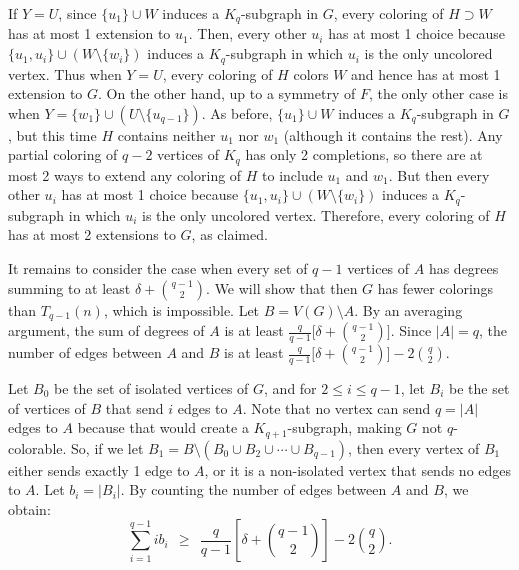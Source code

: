 \documentclass[11pt]{article}
\begin{document}
If $Y = U$, since $\{u_1\} \cup W$ induces a $K_q$-subgraph in $G$,
every coloring of $H \supset W$ has at most 1 extension to $u_1$.
Then, every other $u_i$ has at most 1 choice because $\{u_1, u_i\}
\cup (W \setminus \{w_i\})$ induces a $K_q$-subgraph in which $u_i$ is
the only uncolored vertex.  Thus when $Y = U$, every coloring of $H$
colors $W$ and hence has at most 1 extension to $G$.  On the other
hand, up to a symmetry of $F$, the only other case is when $Y =
\{w_1\} \cup (U \setminus \{u_{q-1}\})$.  As before, $\{u_1\} \cup W$
induces a $K_q$-subgraph in $G$, but this time $H$ contains neither
$u_1$ nor $w_1$ (although it contains the rest).  Any partial coloring
of $q-2$ vertices of $K_q$ has only 2 completions, so there are at
most 2 ways to extend any coloring of $H$ to include $u_1$ and $w_1$.
But then every other $u_i$ has at most 1 choice because $\{u_1, u_i\}
\cup (W \setminus \{w_i\})$ induces a $K_q$-subgraph in which $u_i$ is
the only uncolored vertex.  Therefore, every coloring of $H$ has at
most 2 extensions to $G$, as claimed.




It remains to consider the case when every set of $q-1$ vertices of
$A$ has degrees summing to at least $\delta + {q-1 \choose 2}$.  We
will show that then $G$ has fewer colorings than $T_{q-1}(n)$, which
is impossible.  Let $B = V(G) \setminus A$.  By an averaging argument,
the sum of degrees of $A$ is at least $\frac{q}{q-1} \big[ \delta +
{q-1 \choose 2} \big]$. Since $|A|=q$, the number of edges between $A$ and $B$ is
at least $\frac{q}{q-1} \big[ \delta + {q-1 \choose 2} \big] - 2 {q
  \choose 2}$.

Let $B_0$ be the set of isolated vertices of $G$, and for $2 \leq i
\leq q-1$, let $B_i$ be the set of vertices of $B$ that send $i$ edges
to $A$.  Note that no vertex can send $q = |A|$ edges to $A$ because
that would create a $K_{q+1}$-subgraph, making $G$ not $q$-colorable.
So, if we let $B_1 = B \setminus (B_0 \cup B_2 \cup \cdots \cup
B_{q-1})$, then every vertex of $B_1$ either sends exactly 1 edge to
$A$, or it is a non-isolated vertex that sends no edges to $A$.  Let
$b_i = |B_i|$.  By counting the number of edges between $A$ and $B$,
we obtain:
\begin{equation}
  \label{ineq:sum-ibi}
  \sum_{i=1}^{q-1} i b_i 
  \ \ \geq \ \ 
  \frac{q}{q-1} \left[ \delta + {q-1 \choose 2} \right] 
  - 2 {q \choose 2}.
\end{equation}
\end{document}
